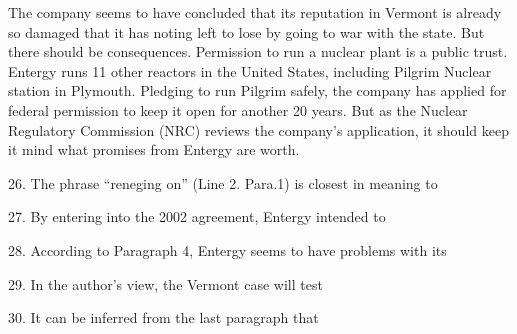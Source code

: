 \qquad The company seems to have concluded that its reputation in Vermont is already so damaged that it has noting left to lose by going to war with the state. But there should be consequences. Permission to run a nuclear plant is a public trust. Entergy runs 11 other reactors in the United States, including Pilgrim Nuclear station in Plymouth. Pledging to run Pilgrim safely, the company has applied for federal permission to keep it open for another 20 years. But as the Nuclear Regulatory Commission (NRC) reviews the company's application, it should keep it mind what promises from Entergy are worth.

\vspace{6pt}

26. The phrase ``reneging on'' (Line 2. Para.1) is closest in meaning to\par

27. By entering into the 2002 agreement, Entergy intended to\par

28. According to Paragraph 4, Entergy seems to have problems with its\par

29. In the author's view, the Vermont case will test\par

30. It can be inferred from the last paragraph that\par
